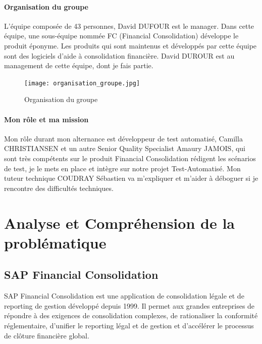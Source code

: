         \paragraph{Organisation du groupe} L'équipe composée de 43 personnes, David DUFOUR est le manager. Dans cette équipe, une sous-équipe nommée FC (Financial Consolidation) développe le produit éponyme. Les produits qui sont maintenus et développés par cette équipe sont des logiciels d’aide à consolidation financière. David DUROUR est au management de cette équipe, dont je fais partie. 
        
        
        \begin{figure}[H]
            \centering
            \texttt{[image: organisation\_groupe.jpg]}
            \caption{Organisation du groupe}
            \label{fig:group_organization_label}
        \end{figure}
        
        \paragraph{Mon rôle et ma mission}
        Mon rôle durant mon alternance est développeur de test automatisé, Camilla CHRISTIANSEN et un autre Senior Quality Specialist Amaury JAMOIS, qui sont très compétents sur le produit Financial Consolidation rédigent les scénarios de test, je le mets en place et intègre sur notre projet Test-Automatisé. Mon tuteur technique COUDRAY Sébastien va m'expliquer et m'aider à déboguer si je rencontre des difficultés techniques.
\newpage
\section{Analyse et Compréhension de la problématique}

\subsection{SAP Financial Consolidation}
\label{subsec: SAP Fiancial Consolidation}
\par SAP Financial Consolidation est une application de consolidation légale et de reporting de gestion développé depuis 1999. Il permet aux grandes entreprises de répondre à des exigences de consolidation complexes, de rationaliser la conformité réglementaire, d'unifier le reporting légal et de gestion et d'accélérer le processus de clôture financière global.\cite{About-FC}


